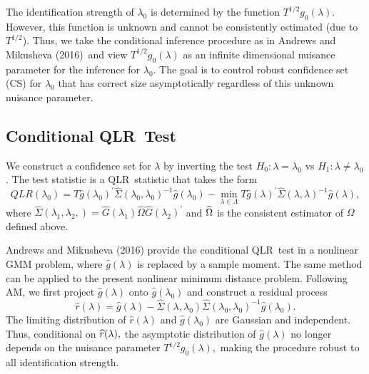\documentclass[11pt]{article}
\begin{document}
The identification strength of $\lambda _{0}$ is determined by the function $%
T^{1/2}g_{0}(\lambda ).$ However, this function is unknown and cannot be
consistently estimated (due to $T^{1/2}$). Thus, we take the conditional
inference procedure as in Andrews and Mikusheva (2016)\ and view $%
T^{1/2}g_{0}(\lambda )$ as an infinite dimensional nuisance parameter for
the inference for $\lambda _{0}$. The goal is to control robust confidence
set (CS) for $\lambda _{0}$ that has correct size asymptotically regardless
of this unknown nuisance parameter.

\subsection{Conditional QLR\ Test}

We construct a confidence set for $\lambda $ by inverting the test $%
H_{0}:\lambda =\lambda _{0}$ vs $H_{1}:\lambda \neq \lambda _{0}$. The test
statistic is a QLR\ statistic that takes the form%
\begin{equation}
QLR(\lambda _{0})=T\widehat{g}(\lambda _{0})^{\prime }\widehat{\Sigma }%
(\lambda _{0},\lambda _{0})^{-1}\widehat{g}(\lambda _{0})-\underset{\lambda
\in \Lambda }{\min }T\widehat{g}(\lambda )^{\prime }\widehat{\Sigma }%
(\lambda ,\lambda )^{-1}\widehat{g}(\lambda ),  \label{QLR stat}
\end{equation}%
where $\widehat{\Sigma }(\lambda _{1},\lambda _{2},)=\widehat{G}(\lambda
_{1})\widehat{\Omega }\widehat{G}(\lambda _{2})^{\prime }$ and $\widehat{%
\Omega }$ is the consistent estimator of $\Omega $ defined above$.$

Andrews and Mikusheva (2016) provide the conditional QLR\ test in a
nonlinear GMM problem, where $\widehat{g}(\lambda )$ is replaced by a sample
moment. The same method can be applied to the present nonlinear minimum
distance problem. Following AM, we first project $\widehat{g}(\lambda )$
onto $\widehat{g}(\lambda _{0})$ and construct a residual process%
\begin{equation}
\widehat{r}(\lambda )=\widehat{g}(\lambda )-\widehat{\Sigma }(\lambda
,\lambda _{0})\widehat{\Sigma }(\lambda _{0},\lambda _{0})^{-1}\widehat{g}%
(\lambda _{0}).  \label{red process}
\end{equation}%
The limiting distribution of $\widehat{r}(\lambda )$ and $\widehat{g}%
(\lambda _{0})$ are Gaussian and independent. Thus, conditional on $\widehat{%
r}(\lambda ),$ the asymptotic distribution of $\widehat{g}(\lambda )$ no
longer depends on the nuisance parameter $T^{1/2}g_{0}(\lambda ),$ making
the procedure robust to all identification strength.
\end{document}
